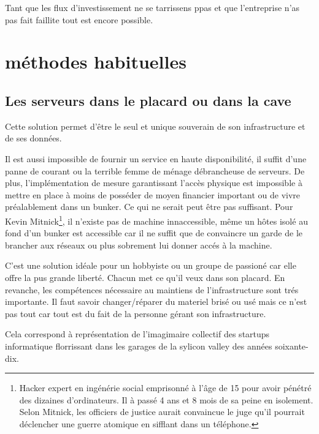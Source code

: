 \documentclass[11pt, a4paper ]{article}
\let\stdsection\section
\renewcommand\section{\newpage\stdsection}
\begin{document}
\begin{spacing}{1.5}
Tant que les flux d'investissement ne se tarrissens ppas et que l'entreprise n'as pas fait faillite tout est encore possible.



		\section{méthodes habituelles} %

			\subsection{Les serveurs dans le placard ou dans la cave}

Cette solution permet d'être le seul et unique souverain de son infrastructure et de ses données. 

Il est aussi impossible de fournir un service en haute disponibilité, il suffit d'une panne de courant ou la terrible femme de ménage débrancheuse de serveurs. 
De plus, l'implémentation de mesure garantissant l'accès physique est impossible à mettre en place à moins de posséder de moyen financier important ou de vivre préalablement dans un bunker. Ce qui ne serait peut être pas suffisant. Pour Kevin Mitnick\footnote{Hacker expert en ingénérie social emprisonné à l'âge de 15 pour avoir pénétré des dizaines d'ordinateurs. Il à passé 4 ans et 8 mois de sa peine en isolement. Selon Mitnick, les officiers de justice aurait convaincue le juge qu'il pourrait déclencher une guerre atomique en sifflant dans un téléphone.}, il n'existe pas de machine innaccessible, même un hôtes isolé au fond d'un bunker est accessible car il ne suffit que de convaincre un garde de le brancher aux réseaux ou plus sobrement lui donner accés à la machine.

C'est une solution idéale pour un hobbyiste ou un groupe de passioné car elle offre la pus grande liberté. Chacun met ce qu'il veux dans son placard. En revanche, les compétences nécessaire au maintiens de l'infrastructure sont trés importante. Il faut savoir changer/réparer du materiel brisé ou usé mais ce n'est pas tout car tout est du fait de la personne gérant son infrastructure. 

Cela correspond à représentation de l'imagimaire collectif des startups informatique florrissant dans les garages de la sylicon valley des années soixante-dix. 


\end{spacing}
\end{document}
